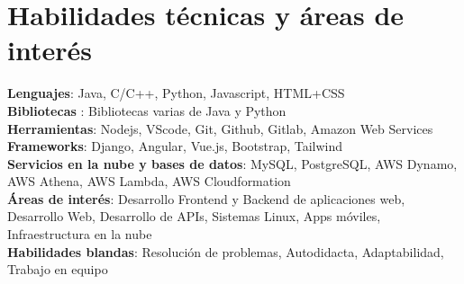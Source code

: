 \documentclass[a4paper,11pt]{article}
\makeatletter
\newcommand{\resumePOR}[3]{
\vspace{0.5mm}\item
    \begin{tabular*}{0.97\textwidth}[t]{l@{\extracolsep{\fill}}r}
        \textbf{#1}\hspace{0.3mm}#2 & \textit{\small{#3}} 
    \end{tabular*}
    \vspace{-2mm}
}
\newcommand{\resumeSubHeadingListStart}{\begin{itemize}[leftmargin=*,labelsep=0mm]}
\newcommand{\resumeItemListStart}{\begin{justify}\begin{itemize}[leftmargin=3ex, rightmargin=2ex, noitemsep,labelsep=1.2mm,itemsep=0mm]\small}
\newcommand{\resumeSubHeadingListEnd}{\end{itemize}\vspace{2mm}}
\newcommand{\resumeItemListEnd}{\end{itemize}\end{justify}\vspace{-2mm}}
\makeatother
\begin{document}
\section{\textbf{Habilidades técnicas y áreas de interés}}
 \begin{itemize}[leftmargin=0.05in, label={}]
    \small{\item{
     \textbf{Lenguajes}{: Java, C/C++, Python, Javascript, HTML+CSS } \\
     \textbf{Bibliotecas }{: Bibliotecas varias de Java y Python }\\ 
     \textbf{Herramientas}{: Nodejs, VScode, Git, Github, Gitlab, Amazon Web Services } \\ 
     \textbf{Frameworks}{: Django, Angular, Vue.js, Bootstrap, Tailwind } \\
     \textbf{Servicios en la nube y bases de datos}{: MySQL, PostgreSQL, AWS Dynamo, AWS Athena, AWS Lambda, AWS Cloudformation } \\   
     \textbf{Áreas de interés}{: Desarrollo Frontend y Backend de aplicaciones web, Desarrollo Web, Desarrollo de APIs, Sistemas Linux, Apps móviles, Infraestructura en la nube } \\
     \textbf{Habilidades blandas}{: Resolución de problemas, Autodidacta, Adaptabilidad, Trabajo en equipo} \\
    }}
 \end{itemize}
 \vspace{-16pt}



\begin{comment}
\section{\textbf{Positions of Responsibility}}
\vspace{-0.4mm}
\resumeSubHeadingListStart
\resumePOR{On Desk Registrations Volunteer } %
    {Aarhant Cyber Week Event - RCOEM, Nagpur} %
    {Oct - Dec 2022} %
    \resumeItemListStart
    \item {Helped to attract close to 300 attendees to the event.}
    \item {Collected over Rs. 20,000 in entry fees for different activities.}
    \resumeItemListEnd

\resumeSubHeadingListEnd
\vspace{-5mm}
\end{comment}
\end{document}
